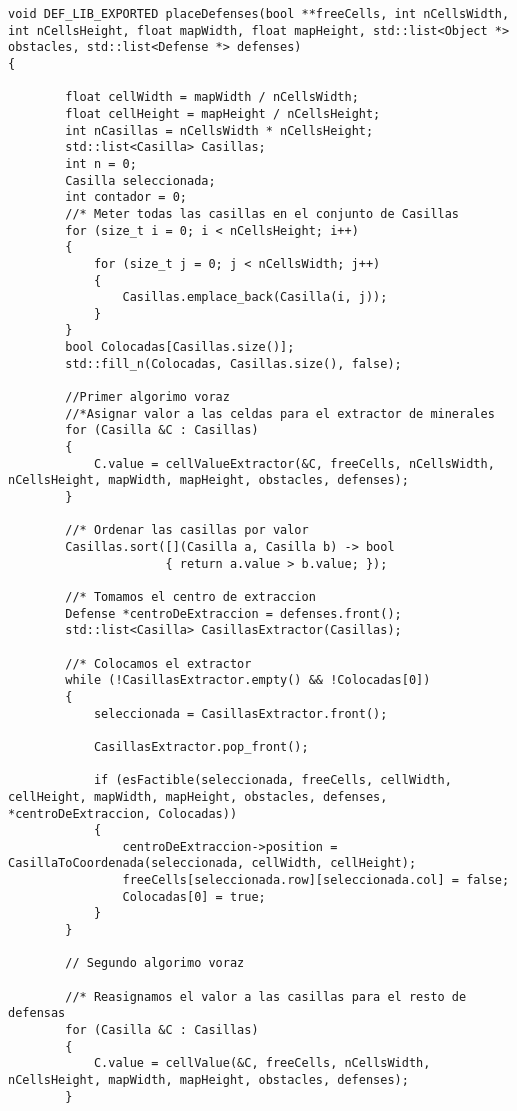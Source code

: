 \begin{lstlisting}
void DEF_LIB_EXPORTED placeDefenses(bool **freeCells, int nCellsWidth, int nCellsHeight, float mapWidth, float mapHeight, std::list<Object *> obstacles, std::list<Defense *> defenses)
{
    
        float cellWidth = mapWidth / nCellsWidth;
        float cellHeight = mapHeight / nCellsHeight;
        int nCasillas = nCellsWidth * nCellsHeight;
        std::list<Casilla> Casillas;
        int n = 0;
        Casilla seleccionada;
        int contador = 0;
        //* Meter todas las casillas en el conjunto de Casillas
        for (size_t i = 0; i < nCellsHeight; i++)
        {
            for (size_t j = 0; j < nCellsWidth; j++)
            {
                Casillas.emplace_back(Casilla(i, j));
            }
        }
        bool Colocadas[Casillas.size()];
        std::fill_n(Colocadas, Casillas.size(), false);

        //Primer algorimo voraz
        //*Asignar valor a las celdas para el extractor de minerales
        for (Casilla &C : Casillas)
        {
            C.value = cellValueExtractor(&C, freeCells, nCellsWidth, nCellsHeight, mapWidth, mapHeight, obstacles, defenses);
        }

        //* Ordenar las casillas por valor
        Casillas.sort([](Casilla a, Casilla b) -> bool
                      { return a.value > b.value; });
    
        //* Tomamos el centro de extraccion
        Defense *centroDeExtraccion = defenses.front();
        std::list<Casilla> CasillasExtractor(Casillas);
    
        //* Colocamos el extractor
        while (!CasillasExtractor.empty() && !Colocadas[0])
        {
            seleccionada = CasillasExtractor.front();
    
            CasillasExtractor.pop_front();
    
            if (esFactible(seleccionada, freeCells, cellWidth, cellHeight, mapWidth, mapHeight, obstacles, defenses, *centroDeExtraccion, Colocadas))
            {
                centroDeExtraccion->position = CasillaToCoordenada(seleccionada, cellWidth, cellHeight);
                freeCells[seleccionada.row][seleccionada.col] = false;
                Colocadas[0] = true;
            }
        }

        // Segundo algorimo voraz
    
        //* Reasignamos el valor a las casillas para el resto de defensas
        for (Casilla &C : Casillas)
        {
            C.value = cellValue(&C, freeCells, nCellsWidth, nCellsHeight, mapWidth, mapHeight, obstacles, defenses);
        }
    

\end{lstlisting}
